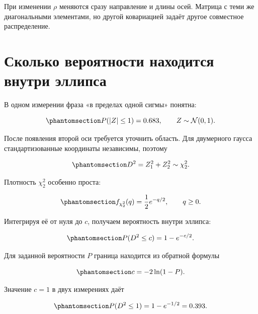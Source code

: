 \documentclass[
  russian,
  11pt,
  a4paper,
  open=any]{scrbook}
\begin{document}
При изменении \(\rho\) меняются сразу направление и длины осей. Матрица
с теми же диагональными элементами, но другой ковариацией задаёт другое
совместное распределение.

\section{Сколько вероятности находится внутри
эллипса}\label{ux441ux43aux43eux43bux44cux43aux43e-ux432ux435ux440ux43eux44fux442ux43dux43eux441ux442ux438-ux43dux430ux445ux43eux434ux438ux442ux441ux44f-ux432ux43dux443ux442ux440ux438-ux44dux43bux43bux438ux43fux441ux430}

В одном измерении фраза «в пределах одной сигмы» понятна:

\begin{equation}\protect\phantomsection\label{eq-ch7-one-dimensional-one-sigma}{
P(|Z|\leq1)=0.683,
\qquad Z\sim\mathcal N(0,1).
}\end{equation}

После появления второй оси требуется уточнить область. Для двумерного
гаусса стандартизованные координаты независимы, поэтому

\begin{equation}\protect\phantomsection\label{eq-ch7-mahalanobis-chi-square-two}{
D^2=Z_1^2+Z_2^2\sim\chi_2^2.
}\end{equation}

Плотность \(\chi_2^2\) особенно проста:

\begin{equation}\protect\phantomsection\label{eq-ch7-chi-square-two-density}{
f_{\chi_2^2}(q)=\frac12e^{-q/2},
\qquad q\geq0.
}\end{equation}

Интегрируя её от нуля до \(c\), получаем вероятность внутри эллипса:

\begin{equation}\protect\phantomsection\label{eq-ch7-contour-probability}{
P(D^2\leq c)=1-e^{-c/2}.
}\end{equation}

Для заданной вероятности \(P\) граница находится из обратной формулы

\begin{equation}\protect\phantomsection\label{eq-ch7-contour-threshold}{
c=-2\ln(1-P).
}\end{equation}

Значение \(c=1\) в двух измерениях даёт

\begin{equation}\protect\phantomsection\label{eq-ch7-two-dimensional-unit-contour}{
P(D^2\leq1)=1-e^{-1/2}=0.393.
}\end{equation}
\end{document}
